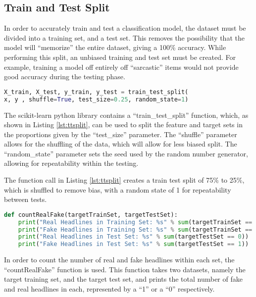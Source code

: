 \subsection{Train and Test Split}

In order to accurately train and test a classification model, the dataset must
be divided into a training set, and a test set. This removes the possibility
that the model will ``memorize'' the entire dataset, giving a 100\% accuracy.
While performing this split, an unbiased training and test set must be created.
For example, training a model off entirely off ``sarcastic'' items would not
provide good accuracy during the testing phase.

\begin{lstlisting}[language=Python, caption={sklearn ``train\_test\_split''
function},
label={lst:ttsplit}]
X_train, X_test, y_train, y_test = train_test_split(
x, y , shuffle=True, test_size=0.25, random_state=1)
\end{lstlisting}

The scikit-learn python library contains a ``train\_test\_split'' function,
which, as shown in Listing \ref{lst:ttsplit}, can be used to split the feature
and target sets in the proportions given by the ``test\_size'' parameter. The
``shuffle'' parameter allows for the shuffling of the data, which will allow for
less biased split. The ``random\_state'' parameter sets the seed used by the
random number generator, allowing for repeatability within the
testing\cite{sk_ttsplit}.

The function call in Listing \ref{lst:ttsplit} creates a train test split of
75\% to 25\%, which is shuffled to remove bias, with a random state of 1 for
repeatability between tests.

\begin{lstlisting}[language=Python, caption={``countRealFake'' function},
label={lst:realFake}]
def countRealFake(targetTrainSet, targetTestSet):
    print("Real Headlines in Training Set: %s" % sum(targetTrainSet == 0))
    print("Fake Headlines in Training Set: %s" % sum(targetTrainSet == 1))
    print("Real Headlines in Test Set: %s" % sum(targetTestSet == 0))
    print("Fake Headlines in Test Set: %s" % sum(targetTestSet == 1))
\end{lstlisting}

In order to count the number of real and fake headlines within each set, the
``countRealFake'' function is used. This function takes two datasets, namely the
target training set, and the target test set, and prints the total number of
fake and real headlines in each, represented by a ``1'' or a ``0'' respectively.

